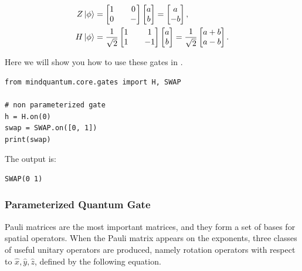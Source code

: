 \begin{align*}
    Z\ket{\phi} & =
    \begin{bmatrix}
        1 &  & 0 \\
        0 &  & -
    \end{bmatrix}
    \begin{bmatrix}
        a \\
        b
    \end{bmatrix}=
    \begin{bmatrix}
        a \\
        -b
    \end{bmatrix}, \\
    H\ket{\phi} & =
    \frac{1}{\sqrt{2}}
    \begin{bmatrix}
        1 &  & 1  \\
        1 &  & -1
    \end{bmatrix}
    \begin{bmatrix}
        a \\
        b
    \end{bmatrix}=
    \frac{1}{\sqrt{2}}
    \begin{bmatrix}
        a+b \\
        a-b
    \end{bmatrix}.
\end{align*}

Here we will show you how to use these gates in \MindQuantum.

\begin{lstlisting}
from mindquantum.core.gates import H, SWAP

# non parameterized gate
h = H.on(0)
swap = SWAP.on([0, 1])
print(swap)
\end{lstlisting}
The output is:
\begin{lstlisting}
SWAP(0 1)
\end{lstlisting}

\subsubsection{Parameterized Quantum Gate}
Pauli matrices are the most important matrices, and they form a set of bases for spatial operators. When the Pauli matrix appears on the exponents, three classes of useful unitary operators are produced, namely rotation operators with respect to $\hat{x}, \hat{y}, \hat{z}$, defined by the following equation.

